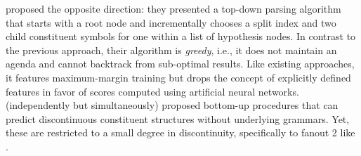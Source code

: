 \documentclass[../document.tex]{subfiles}
\begin{document}
    \citet{Stern17} proposed the opposite direction: they presented a top-down parsing algorithm that starts with a root node and incrementally chooses a split index and two child constituent symbols for one within a list of hypothesis nodes.
    In contrast to the previous approach, their algorithm is \emph{greedy}, i.e., it does not maintain an agenda and cannot backtrack from sub-optimal results.
    Like existing approaches, it features maximum-margin training but drops the concept of explicitly defined features in favor of scores computed using artificial neural networks.
    \citet{Cor20,StaSte20} (independently but simultaneously) proposed bottom-up procedures that can predict discontinuous constituent structures without underlying grammars.
    Yet, these are restricted to a small degree in discontinuity, specifically to fanout 2 like .
\end{document}

